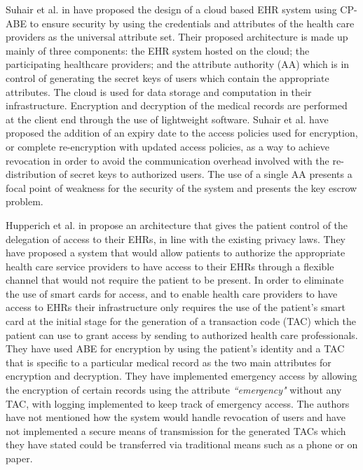 Suhair et al. in \cite{Alshehri} have proposed the design of a cloud based EHR system using CP-ABE to ensure security by using the credentials and attributes of the health care providers as the universal attribute set. Their proposed architecture is made up mainly of three components: the EHR system hosted on the cloud; the participating healthcare providers; and the attribute authority (AA) which is in control of generating the secret keys of users which contain the appropriate attributes. The cloud is used for data storage and computation in their infrastructure. Encryption and decryption of the medical records are performed at the client end through the use of lightweight software. Suhair et al. have proposed the addition of an expiry date to the access policies used for encryption, or complete re-encryption with updated access policies, as a way to achieve revocation in order to avoid the communication overhead involved with the re-distribution of secret keys to authorized users. The use of a single AA presents a focal point of weakness for the security of the system and presents the key escrow problem.

Hupperich et al. in \cite{Hupperich2012} propose an architecture that gives the patient control of the delegation of access to their EHRs, in line with the existing privacy laws. They have proposed a system that would allow patients to authorize the appropriate health care service providers to have access to their EHRs through a flexible channel that would not require the patient to be present. In order to eliminate the use of smart cards for access, and to enable health care providers to have access to EHRs their infrastructure only requires the use of the patient’s smart card at the initial stage for the generation of a transaction code (TAC) which the patient can use to grant access by sending to authorized health care professionals. They have used ABE for encryption by using the patient’s identity and a TAC that is specific to a particular medical record as the two main attributes for encryption and decryption. They have implemented emergency access by allowing the encryption of certain records using the attribute \textit{``emergency"} without any TAC, with logging implemented to keep track of emergency access. The authors have not mentioned how the system would handle revocation of users and have not implemented a secure means of transmission for the generated TACs which they have stated could be transferred via traditional means such as a phone or on paper.

